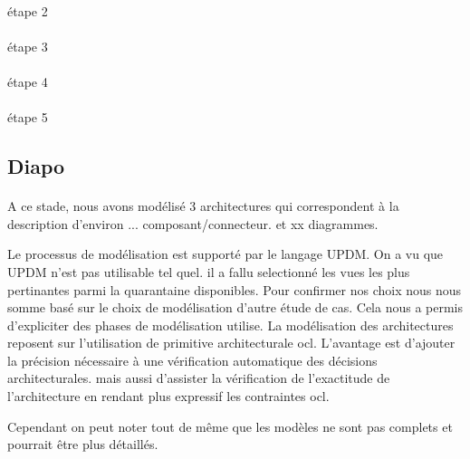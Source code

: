 \paragraph{}
étape 2 

\paragraph{}
étape 3 

\paragraph{}
étape 4 

\paragraph{}
étape 5 

\subsection{Diapo }

\paragraph{} 
A ce stade, nous avons modélisé 3 architectures qui correspondent à
la description d'environ ... composant/connecteur. et xx diagrammes.

Le processus de modélisation est supporté par le langage UPDM. On a vu
que UPDM n'est pas utilisable tel quel. il a fallu selectionné les
vues les plus pertinantes parmi la quarantaine disponibles. Pour
confirmer nos choix nous nous somme basé sur le choix de modélisation
d'autre étude de cas. 
%
Cela nous a permis d'expliciter des phases de
modélisation utilise. 
%
La modélisation des architectures reposent sur
l'utilisation de primitive architecturale ocl. L'avantage est
d'ajouter la précision nécessaire à une vérification automatique des
décisions architecturales. mais aussi d'assister la vérification de
l'exactitude de l'architecture en rendant plus expressif les
contraintes ocl. 

Cependant on peut noter tout de même que les modèles ne sont pas
complets  et pourrait être plus détaillés. 
